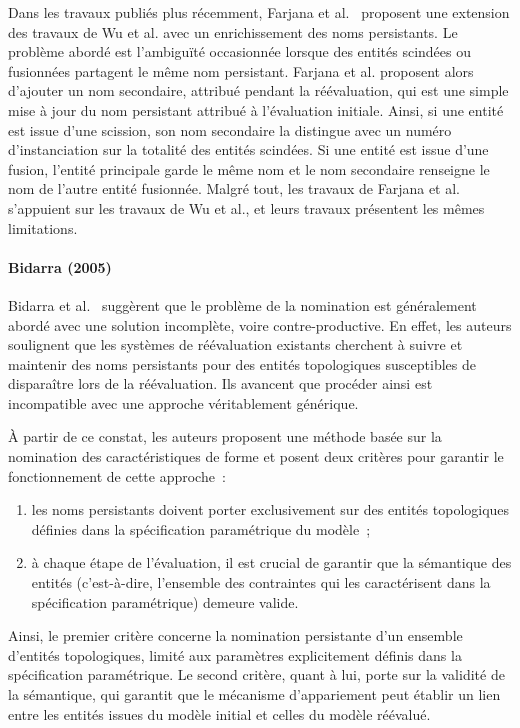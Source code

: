 Dans les travaux publiés plus récemment, Farjana et
al.~\cite{farjana2015method,farjana2016implementation} proposent une extension
des travaux de Wu et al. avec un enrichissement des noms persistants. %
Le problème abordé est l'ambiguïté occasionnée lorsque des entités scindées ou fusionnées partagent le même nom persistant. %
Farjana et al. proposent alors d'ajouter un nom secondaire, attribué pendant la
réévaluation, qui est une simple mise à jour du nom persistant attribué à
l'évaluation initiale. %
Ainsi, si une entité est issue d'une scission, son nom secondaire la distingue avec un numéro d'instanciation sur la totalité des entités scindées. %
Si une entité est issue d'une fusion, l'entité principale garde le même nom et
le nom secondaire renseigne le nom de l'autre entité fusionnée. %
Malgré tout, les travaux de Farjana et al. s'appuient sur les travaux de Wu et
al., et leurs travaux présentent les mêmes limitations. %


\paragraph*{Bidarra (2005)}



Bidarra et al.~\cite{bidarra2005feature} suggèrent que le problème de la
nomination est généralement abordé avec une solution incomplète, voire
contre-productive. %
En effet, les auteurs soulignent que les systèmes de réévaluation existants
cherchent à suivre et maintenir des noms persistants pour des entités
topologiques susceptibles de disparaître lors de la réévaluation. %
Ils avancent que procéder ainsi est incompatible avec une approche
véritablement générique. %

À partir de ce constat, les auteurs proposent une méthode basée sur la nomination des caractéristiques de forme et posent deux critères pour garantir le fonctionnement de cette approche~: %
\begin{enumerate}
	\item les noms persistants doivent porter exclusivement sur des entités
	      topologiques définies dans la spécification paramétrique du modèle~; %
	\item à chaque étape de l'évaluation, il est crucial de garantir que la sémantique des entités (c'est-à-dire, l'ensemble des contraintes qui les caractérisent dans la spécification paramétrique) demeure valide. %
\end{enumerate}

Ainsi, le premier critère concerne la nomination persistante d'un ensemble d'entités topologiques, limité aux paramètres explicitement définis dans la spécification paramétrique. Le second critère, quant à lui, porte sur la validité de la sémantique, qui garantit que le mécanisme d'appariement peut établir un lien entre les entités issues du modèle initial et celles du modèle réévalué.  %

